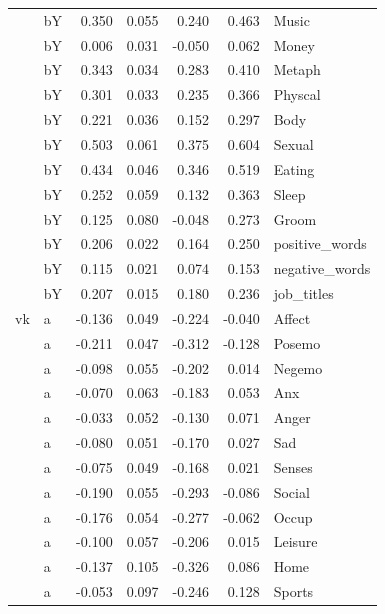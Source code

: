 \documentclass[11pt,a4paper]{article}
\begin{document}
\begin{longtable}{llrrrrl}
   & bY &  0.350 &  0.055 &    0.240 &     0.463 &           Music \\
   & bY &  0.006 &  0.031 &   -0.050 &     0.062 &           Money \\
   & bY &  0.343 &  0.034 &    0.283 &     0.410 &          Metaph \\
   & bY &  0.301 &  0.033 &    0.235 &     0.366 &         Physcal \\
   & bY &  0.221 &  0.036 &    0.152 &     0.297 &            Body \\
   & bY &  0.503 &  0.061 &    0.375 &     0.604 &          Sexual \\
   & bY &  0.434 &  0.046 &    0.346 &     0.519 &          Eating \\
   & bY &  0.252 &  0.059 &    0.132 &     0.363 &           Sleep \\
   & bY &  0.125 &  0.080 &   -0.048 &     0.273 &           Groom \\
   & bY &  0.206 &  0.022 &    0.164 &     0.250 &  positive\_words \\
   & bY &  0.115 &  0.021 &    0.074 &     0.153 &  negative\_words \\
   & bY &  0.207 &  0.015 &    0.180 &     0.236 &      job\_titles \\
vk & a & -0.136 &  0.049 &   -0.224 &    -0.040 &          Affect \\
   & a & -0.211 &  0.047 &   -0.312 &    -0.128 &          Posemo \\
   & a & -0.098 &  0.055 &   -0.202 &     0.014 &          Negemo \\
   & a & -0.070 &  0.063 &   -0.183 &     0.053 &             Anx \\
   & a & -0.033 &  0.052 &   -0.130 &     0.071 &           Anger \\
   & a & -0.080 &  0.051 &   -0.170 &     0.027 &             Sad \\
   & a & -0.075 &  0.049 &   -0.168 &     0.021 &          Senses \\
   & a & -0.190 &  0.055 &   -0.293 &    -0.086 &          Social \\
   & a & -0.176 &  0.054 &   -0.277 &    -0.062 &           Occup \\
   & a & -0.100 &  0.057 &   -0.206 &     0.015 &         Leisure \\
   & a & -0.137 &  0.105 &   -0.326 &     0.086 &            Home \\
   & a & -0.053 &  0.097 &   -0.246 &     0.128 &          Sports \\

\end{longtable}
\end{document}
